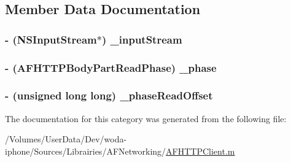 \subsection{Member Data Documentation}
\hypertarget{category_a_f_h_t_t_p_body_part_07_08_a3ff59819a038e5b89a041b6e59b9f858}{
\subsubsection[{\-\_\-input\-Stream}]{\setlength{\rightskip}{0pt plus 5cm}-\/ (N\-S\-Input\-Stream$\ast$) \-\_\-input\-Stream\hspace{0.3cm}{\ttfamily [protected]}}}\label{category_a_f_h_t_t_p_body_part_07_08_a3ff59819a038e5b89a041b6e59b9f858}
\hypertarget{category_a_f_h_t_t_p_body_part_07_08_a9e462f49c6b01eb159ee18e4dfa9f2dc}{
\subsubsection[{\-\_\-phase}]{\setlength{\rightskip}{0pt plus 5cm}-\/ ({\bf A\-F\-H\-T\-T\-P\-Body\-Part\-Read\-Phase}) \-\_\-phase\hspace{0.3cm}{\ttfamily [protected]}}}\label{category_a_f_h_t_t_p_body_part_07_08_a9e462f49c6b01eb159ee18e4dfa9f2dc}
\hypertarget{category_a_f_h_t_t_p_body_part_07_08_ab23d067a3e044b62a837e737042cd721}{
\subsubsection[{\-\_\-phase\-Read\-Offset}]{\setlength{\rightskip}{0pt plus 5cm}-\/ (unsigned long long) \-\_\-phase\-Read\-Offset\hspace{0.3cm}{\ttfamily [protected]}}}\label{category_a_f_h_t_t_p_body_part_07_08_ab23d067a3e044b62a837e737042cd721}


The documentation for this category was generated from the following file\-:\begin{DoxyCompactItemize}
\item 
/\-Volumes/\-User\-Data/\-Dev/woda-\/iphone/\-Sources/\-Librairies/\-A\-F\-Networking/\hyperlink{_a_f_h_t_t_p_client_8m}{A\-F\-H\-T\-T\-P\-Client.\-m}\end{DoxyCompactItemize}
